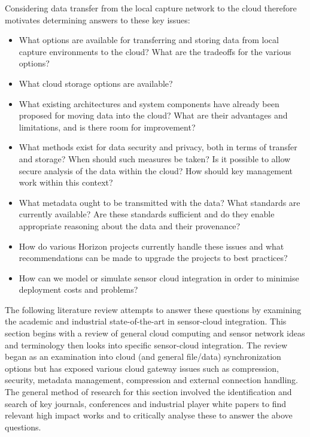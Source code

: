 Considering data transfer from the local capture network to the cloud therefore motivates determining answers to these key issues:
\begin{itemize}
\item What options are available for transferring and storing data from local capture environments to the cloud? What are the tradeoffs for the various options?
\item What cloud storage options are available?
\item What existing architectures and system components have already been proposed for moving data into the cloud? What are their advantages and limitations, and is there room for improvement?
\item What methods exist for data security and privacy, both in terms of transfer and storage? When should such measures be taken? Is it possible to allow secure analysis of the data within the cloud? How should key management work within this context?
\item What metadata ought to be transmitted with the data? What standards are currently available? Are these standards sufficient and do they enable appropriate reasoning about the data and their provenance?
\item How do various Horizon projects currently handle these issues and what recommendations can be made to upgrade the projects to best practices?
\item How can we model or simulate sensor cloud integration in order to minimise deployment costs and problems?
\end{itemize}

The following literature review attempts to answer these questions by examining the academic and industrial state-of-the-art in sensor-cloud integration. This section begins with a review of general cloud computing and sensor network ideas and terminology then looks into specific sensor-cloud integration. The review began as an examination into cloud (and general file/data) synchronization options but has exposed various cloud gateway issues such as compression, security, metadata management, compression and external connection handling. The general method of research for this section involved the identification and search of key journals, conferences and industrial player white papers to find relevant high impact works and to critically analyse these to answer the above questions.

